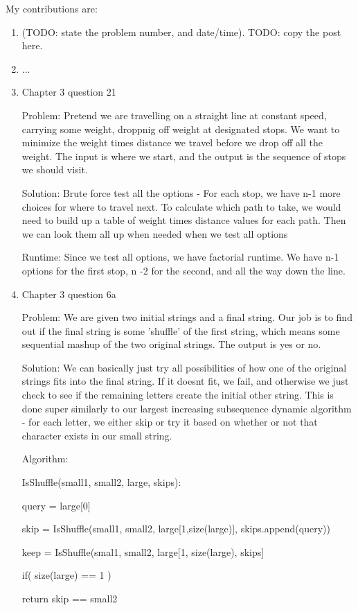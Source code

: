 \documentclass{article}
\begin{document}
My contributions are:
\begin{enumerate}
    \item (TODO: state the problem number, and date/time). TODO:
        copy the post here.
    \item ...
    \item Chapter 3 question 21

Problem: Pretend we are travelling on a straight line at constant speed, carrying some weight, droppnig off weight at designated stops. We want to minimize the weight times distance we travel before we drop off all the weight. The input is where we start, and the output is the sequence of stops we should visit.

Solution: Brute force test all the options - For each stop, we have n-1 more choices for where to travel next. To calculate which path to take, we would need to build up a table of weight times distance values for each path. Then we can look them all up when needed when we test all options

Runtime: Since we test all options, we have factorial runtime. We have n-1 options for the first stop, n -2 for the second, and all the way down the line.
	\item
		Chapter 3 question 6a

Problem: We are given two initial strings and a final string. Our job is to find out if the final string is some 'shuffle' of the first string, which means some sequential mashup of the two original strings. The output is yes or no.

Solution: We can basically just try all possibilities of how one of the original strings fits into the final string. If it doesnt fit, we fail, and otherwise we just check to see if the remaining letters create the initial other string. This is done super similarly to our largest increasing subsequence dynamic algorithm - for each letter, we either skip or try it based on whether or not that character exists in our small string.

Algorithm:

IsShuffle(small1, small2, large, skips):

    query = large[0]

    skip = IsShuffle(small1, small2, large[1,size(large)], skips.append(query))

    keep = IsShuffle(smal1, small2, large[1, size(large), skips]

    if( size(large) == 1 )

        return skip == small2


\end{enumerate}
\end{document}
